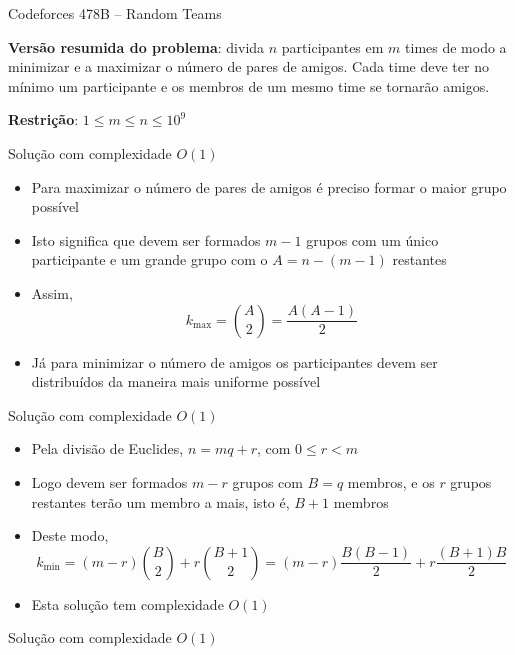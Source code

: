 \begin{frame}[fragile]{Codeforces 478B -- Random Teams}

    \textbf{Versão resumida do problema}: divida $n$ participantes em $m$ times de modo a minimizar
        e a maximizar o número de pares de amigos. Cada time deve ter no mínimo um participante
        e os membros de um mesmo time se tornarão amigos.

    \vspace{0.1in}
    \textbf{Restrição}: $1\leq m\leq n\leq 10^9$

\end{frame}

\begin{frame}[fragile]{Solução com complexidade $O(1)$}

    \begin{itemize}
        \item Para maximizar o número de pares de amigos é preciso formar o maior grupo possível

        \item Isto significa que devem ser formados $m - 1$ grupos com um
            único participante e um grande grupo com o $A = n - (m - 1)$ restantes

        \item Assim,
        $$
            k_{\max} = \binom{A}{2} = \frac{A(A - 1)}{2}
        $$

        \item Já para minimizar o número de amigos os participantes devem ser distribuídos da
            maneira mais uniforme possível
    \end{itemize}

\end{frame}

\begin{frame}[fragile]{Solução com complexidade $O(1)$}

    \begin{itemize}
        \item Pela divisão de Euclides, $n = mq + r$, com $0\leq r < m$

        \item Logo devem ser formados $m - r$ grupos com $B = q$ membros, e os $r$ grupos
            restantes terão um membro a mais, isto é, $B + 1$ membros

        \item Deste modo,
        $$
            k_{\min} = (m - r)\binom{B}{2} + r\binom{B + 1}{2} = (m - r)\frac{B(B - 1)}{2} +
                r\frac{(B + 1)B}{2}
        $$

        \item Esta solução tem complexidade $O(1)$
    \end{itemize}

\end{frame}

\begin{frame}[fragile]{Solução com complexidade $O(1)$}
\end{frame}
